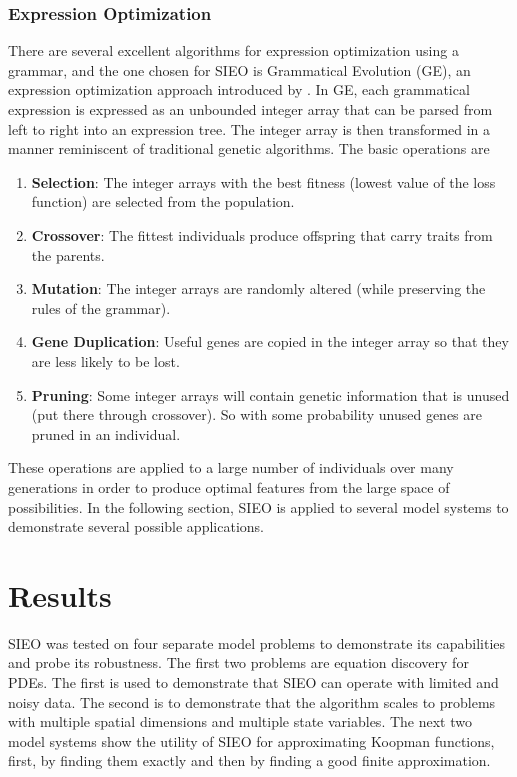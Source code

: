 \documentclass{article}
\begin{document}
\subsubsection{Expression Optimization}
There are several excellent algorithms for expression optimization using a grammar, and the one chosen for SIEO is Grammatical Evolution (GE), an expression optimization approach introduced by \cite{ryan1998grammatical}. In GE, each grammatical expression is expressed as an unbounded integer array that can be parsed from left to right into an expression tree. The integer array is then transformed in a manner reminiscent of traditional genetic algorithms. The basic operations are
\begin{enumerate}
\item \textbf{Selection}: The integer arrays with the best fitness (lowest value of the loss function) are selected from the population.
\item \textbf{Crossover}: The fittest individuals produce offspring that carry traits from the parents.
\item \textbf{Mutation}: The integer arrays are randomly altered (while preserving the rules of the grammar).
\item \textbf{Gene Duplication}: Useful genes are copied in the integer array so that they are less likely to be lost.
\item \textbf{Pruning}: Some integer arrays will contain genetic information that is unused (put there through crossover). So with some probability unused genes are pruned in an individual.
\end{enumerate}

These operations are applied to a large number of individuals over many generations in order to produce optimal features from the large space of possibilities. In the following section, SIEO is applied to several model systems to demonstrate several possible applications.


\section{Results}
\label{results}
SIEO was tested on four separate model problems to demonstrate its capabilities and probe its robustness. The first two problems are equation discovery for PDEs. The first is used to demonstrate that SIEO can operate with limited and noisy data. The second is to demonstrate that the algorithm scales to problems with multiple spatial dimensions and multiple state variables. The next two model systems show the utility of SIEO for approximating Koopman functions, first, by finding them exactly and then by finding a good finite approximation.
\end{document}
